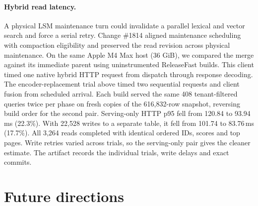 \documentclass[sigconf,nonacm]{acmart}
\begin{document}
\paragraph{Hybrid read latency.} A physical LSM maintenance turn could
invalidate a parallel lexical and vector search and force a serial retry.
Change \#1814 aligned maintenance scheduling with compaction eligibility
and preserved the read revision across physical maintenance. On the same Apple M4 Max host (36 GiB),
we compared the merge against its immediate parent using uninstrumented
ReleaseFast builds. This client timed one native hybrid HTTP request from
dispatch through response decoding. The encoder-replacement trial above
timed two sequential requests and client fusion from scheduled arrival. Each build served the same 408 tenant-filtered queries
twice per phase on fresh copies of the 616,832-row snapshot, reversing build
order for the second pair. Serving-only HTTP p95 fell from 120.84 to
93.94\,ms (22.3\%). With 22,528 writes to a separate table, it fell from
101.74 to 83.76\,ms (17.7\%). All 3,264 reads completed with identical
ordered IDs, scores and top pages. Write retries varied across trials, so
the serving-only pair gives the cleaner estimate. The artifact records the
individual trials, write delays and exact commits.

\section{Future directions}
\label{sec:future}
\end{document}
